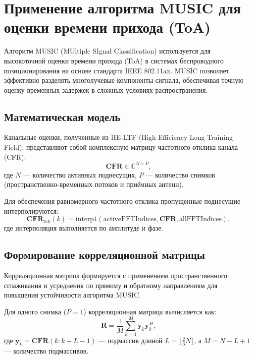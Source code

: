 \documentclass{article}
\begin{document}
\section{Применение алгоритма MUSIC для оценки времени прихода (ToA)}

Алгоритм MUSIC (MUltiple SIgnal Classification) используется для высокоточной оценки времени прихода (ToA) в системах беспроводного позиционирования на основе стандарта IEEE 802.11ax. MUSIC позволяет эффективно разделять многолучевые компоненты сигнала, обеспечивая точную оценку временных задержек в сложных условиях распространения.

\subsection{Математическая модель}

Канальные оценки, полученные из HE-LTF (High Efficiency Long Training Field), представляют собой комплексную матрицу частотного отклика канала (CFR):
\begin{equation}
\mathbf{CFR} \in \mathbb{C}^{N \times P},
\end{equation}
где \( N \) --- количество активных поднесущих, \( P \) --- количество снимков (пространственно-временных потоков и приёмных антенн).

Для обеспечения равномерного частотного отклика пропущенные поднесущие интерполируются:
\begin{equation}
\mathbf{CFR}_{\text{full}}(k) = \text{interp1}(\text{activeFFTIndices}, \mathbf{CFR}, \text{allFFTIndices}),
\end{equation}
где интерполяция выполняется по амплитуде и фазе.

\subsection{Формирование корреляционной матрицы}

Корреляционная матрица формируется с применением пространственного сглаживания и усреднения по прямому и обратному направлениям для повышения устойчивости алгоритма MUSIC.

Для одного снимка (\( P = 1 \)) корреляционная матрица вычисляется как:
\begin{equation}
\mathbf{R} = \frac{1}{M} \sum_{k=1}^{M} \mathbf{y}_k \mathbf{y}_k^H,
\end{equation}
где \( \mathbf{y}_k = \mathbf{CFR}(k:k+L-1) \) --- подмассив длиной \( L = \lfloor \frac{2}{3} N \rfloor \), а \( M = N - L + 1 \) --- количество подмассивов.
\end{document}
